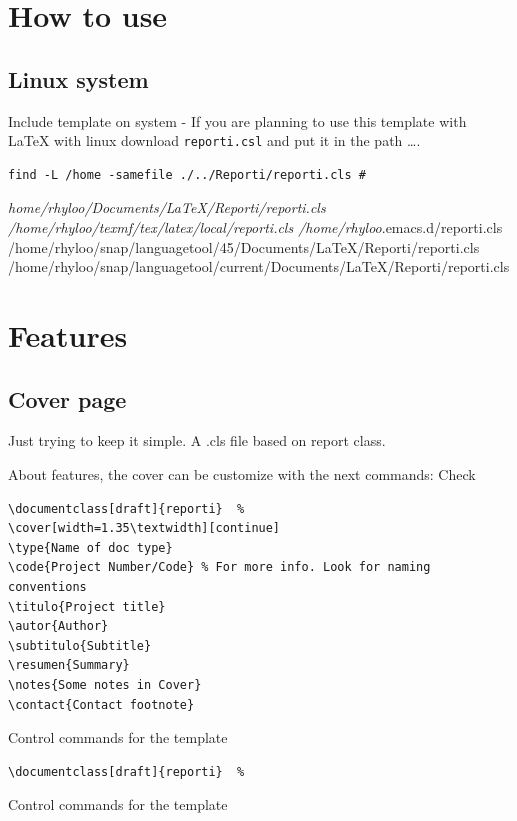 \documentclass[english]{reporti}
\begin{document}
\section{How to use}
\label{sec:org0f53d5a}
\subsection{Linux system}
\label{sec:orgb6bbd2e}
Include template on system - If you are planning to use this template with \LaTeX{} with linux download \texttt{reporti.csl} and put it in the path \ldots{}.

\begin{verbatim}
find -L /home -samefile ./../Reporti/reporti.cls # 
\end{verbatim}

\emph{home/rhyloo/Documents/\LaTeX{}/Reporti/reporti.cls
/home/rhyloo/texmf/tex/latex/local/reporti.cls
/home/rhyloo}.emacs.d/reporti.cls
/home/rhyloo/snap/languagetool/45/Documents/\LaTeX{}/Reporti/reporti.cls
/home/rhyloo/snap/languagetool/current/Documents/\LaTeX{}/Reporti/reporti.cls
\section{Features}
\label{sec:org8b708e7}
\subsection{Cover page}
\label{sec:org5d04d79}
Just trying to keep it simple. A .cls file based on report class.

About features, the cover can be customize with the next commands: Check 

\begin{listing}[htbp]
\begin{verbatim}
\documentclass[draft]{reporti}  %
\cover[width=1.35\textwidth][continue]
\type{Name of doc type}
\code{Project Number/Code} % For more info. Look for naming conventions
\titulo{Project title} 
\autor{Author}
\subtitulo{Subtitle}
\resumen{Summary}
\notes{Some notes in Cover}
\contact{Contact footnote}
\end{verbatim}
\caption{Control commands for the template}
\end{listing}

\begin{listing}[H]
\begin{verbatim}
\documentclass[draft]{reporti}  %
\end{verbatim}
\caption{Control commands for the template}
\end{listing}
\end{document}
